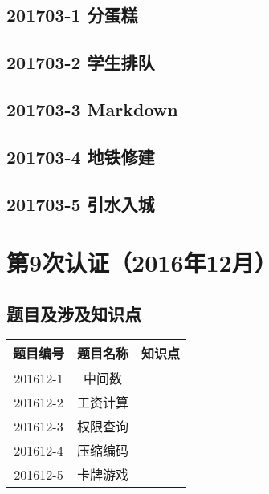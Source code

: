 \documentclass[cn,10pt,math=newtx,citestyle=gb7714-2015,bibstyle=gb7714-2015]{elegantbook}
\newif\ifonlyanalyze %
\begin{document}
\newpage
\section{201703-1 分蛋糕}
\ifonlyanalyze
\else
    
\fi


\newpage
\section{201703-2 学生排队}
\ifonlyanalyze
\else
    
\fi


\newpage
\section{201703-3 Markdown}
\ifonlyanalyze
\else
    
\fi


\newpage
\section{201703-4 地铁修建}
\ifonlyanalyze
\else
    
\fi


\newpage
\section{201703-5 引水入城}
\ifonlyanalyze
\else
    
\fi



\chapter{第9次认证（2016年12月）}

\section{题目及涉及知识点}

\begin{table}[htbp]
    \centering
    \begin{tabular}{ccc}
        \toprule
        题目编号 & 题目名称 & 知识点 \\
        \midrule
        201612-1 & 中间数   &        \\
        201612-2 & 工资计算 &        \\
        201612-3 & 权限查询 &        \\
        201612-4 & 压缩编码 &        \\
        201612-5 & 卡牌游戏 &        \\
        \bottomrule
    \end{tabular}
\end{table}
\end{document}
